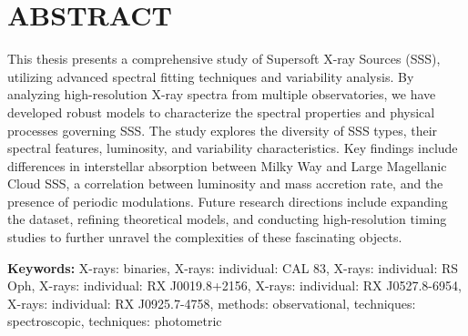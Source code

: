 \chapter*{ABSTRACT}
    
    This thesis presents a comprehensive study of Supersoft X-ray Sources (SSS), utilizing advanced spectral fitting techniques and variability analysis. By analyzing high-resolution X-ray spectra from multiple observatories, we have developed robust models to characterize the spectral properties and physical processes governing SSS. The study explores the diversity of SSS types, their spectral features, luminosity, and variability characteristics. Key findings include differences in interstellar absorption between Milky Way and Large Magellanic Cloud SSS, a correlation between luminosity and mass accretion rate, and the presence of periodic modulations. %
    Future research directions include expanding the dataset, refining theoretical models, and conducting high-resolution timing studies to further unravel the complexities of these fascinating objects.
    
    \textbf{Keywords:} X-rays: binaries, X-rays: individual: CAL 83, X-rays: individual: RS Oph, X-rays: individual: RX J0019.8+2156, X-rays: individual: RX J0527.8-6954, X-rays: individual: RX J0925.7-4758, methods: observational, techniques: spectroscopic, techniques: photometric